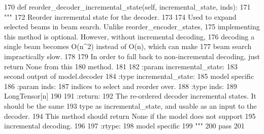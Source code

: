 \begin{DoxyCode}
170     \textcolor{keyword}{def }reorder\_decoder\_incremental\_state(self, incremental\_state, inds):
171         \textcolor{stringliteral}{"""}
172 \textcolor{stringliteral}{        Reorder incremental state for the decoder.}
173 \textcolor{stringliteral}{}
174 \textcolor{stringliteral}{        Used to expand selected beams in beam search. Unlike reorder\_encoder\_states,}
175 \textcolor{stringliteral}{        implementing this method is optional. However, without incremental decoding,}
176 \textcolor{stringliteral}{        decoding a single beam becomes O(n^2) instead of O(n), which can make}
177 \textcolor{stringliteral}{        beam search impractically slow.}
178 \textcolor{stringliteral}{}
179 \textcolor{stringliteral}{        In order to fall back to non-incremental decoding, just return None from this}
180 \textcolor{stringliteral}{        method.}
181 \textcolor{stringliteral}{}
182 \textcolor{stringliteral}{        :param incremental\_state:}
183 \textcolor{stringliteral}{            second output of model.decoder}
184 \textcolor{stringliteral}{        :type incremental\_state:}
185 \textcolor{stringliteral}{            model specific}
186 \textcolor{stringliteral}{        :param inds:}
187 \textcolor{stringliteral}{            indices to select and reorder over.}
188 \textcolor{stringliteral}{        :type inds:}
189 \textcolor{stringliteral}{            LongTensor[n]}
190 \textcolor{stringliteral}{}
191 \textcolor{stringliteral}{        :return:}
192 \textcolor{stringliteral}{            The re-ordered decoder incremental states. It should be the same}
193 \textcolor{stringliteral}{            type as incremental\_state, and usable as an input to the decoder.}
194 \textcolor{stringliteral}{            This method should return None if the model does not support}
195 \textcolor{stringliteral}{            incremental decoding.}
196 \textcolor{stringliteral}{}
197 \textcolor{stringliteral}{        :rtype:}
198 \textcolor{stringliteral}{            model specific}
199 \textcolor{stringliteral}{        """}
200         \textcolor{keywordflow}{pass}
201 
\end{DoxyCode}
\mbox{\label{classparlai_1_1core_1_1torch__generator__agent_1_1TorchGeneratorModel_a9ed5aecabe977856b4c385ba74fa6107}} 
